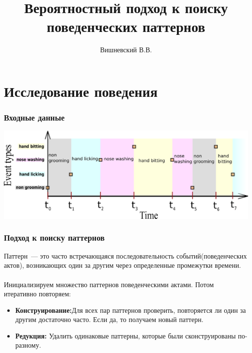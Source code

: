 \documentclass[smaller]{beamer}
\title{Вероятностный подход к поиску поведенческих
паттернов} %
\author %
[~]{Вишневский В.В.}
\begin{document}
\begin{frame}
  \titlepage
\end{frame}




\section{Исследование поведения}


\begin{frame}	
 \frametitle{Входные данные}

\includegraphics[scale=0.5]{beh_data.eps}

\end{frame}


\begin{frame}	
  \frametitle{Подход к поиску паттернов}
Паттерн~--- это часто встречающаяся последовательность событий(поведенческих актов), возникающих один за другим 
через определенные промежутки времени.
\\~\\
  Инициализируем множество паттернов поведенческими актами. Потом итеративно повторяем:
  \begin{itemize}
   \item {\bf Конструирование:}Для всех пар паттернов проверить, повторяется ли один за другим достаточно часто. Если да, 
	то получаем новый паттерн. 
   \item {\bf Редукция:} Удалить одинаковые паттерны, которые были сконструированы по-разному.
  \end{itemize}
\end{frame}
\end{document}
